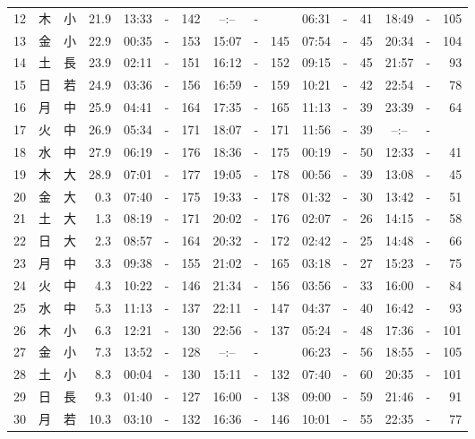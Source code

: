 \documentclass[12pt.a4j]{jsarticle}
\begin{document}
\begin{center}
\begin{table}[ht]
\begin{tabular}{|rc|cr|ccrccr|ccrccr|}
12 & 木 & 小 & 21.9 &  13:33 &-& 142  &  --:-- &-&     &   06:31 &-&  41  &   18:49 &-& 105  \\
13 & 金 & 小 & 22.9 &  00:35 &-& 153  &  15:07 &-& 145  &   07:54 &-&  45  &   20:34 &-& 104  \\
14 & 土 & 長 & 23.9 &  02:11 &-& 151  &  16:12 &-& 152  &   09:15 &-&  45  &   21:57 &-&  93  \\
15 & 日 & 若 & 24.9 &  03:36 &-& 156  &  16:59 &-& 159  &   10:21 &-&  42  &   22:54 &-&  78  \\
16 & 月 & 中 & 25.9 &  04:41 &-& 164  &  17:35 &-& 165  &   11:13 &-&  39  &   23:39 &-&  64  \\
17 & 火 & 中 & 26.9 &  05:34 &-& 171  &  18:07 &-& 171  &   11:56 &-&  39  &   --:-- &-&     \\
18 & 水 & 中 & 27.9 &  06:19 &-& 176  &  18:36 &-& 175  &   00:19 &-&  50  &   12:33 &-&  41  \\
19 & 木 & 大 & 28.9 &  07:01 &-& 177  &  19:05 &-& 178  &   00:56 &-&  39  &   13:08 &-&  45  \\
20 & 金 & 大 &  0.3 &  07:40 &-& 175  &  19:33 &-& 178  &   01:32 &-&  30  &   13:42 &-&  51  \\
21 & 土 & 大 &  1.3 &  08:19 &-& 171  &  20:02 &-& 176  &   02:07 &-&  26  &   14:15 &-&  58  \\
22 & 日 & 大 &  2.3 &  08:57 &-& 164  &  20:32 &-& 172  &   02:42 &-&  25  &   14:48 &-&  66  \\
23 & 月 & 中 &  3.3 &  09:38 &-& 155  &  21:02 &-& 165  &   03:18 &-&  27  &   15:23 &-&  75  \\
24 & 火 & 中 &  4.3 &  10:22 &-& 146  &  21:34 &-& 156  &   03:56 &-&  33  &   16:00 &-&  84  \\
25 & 水 & 中 &  5.3 &  11:13 &-& 137  &  22:11 &-& 147  &   04:37 &-&  40  &   16:42 &-&  93  \\
26 & 木 & 小 &  6.3 &  12:21 &-& 130  &  22:56 &-& 137  &   05:24 &-&  48  &   17:36 &-& 101  \\
27 & 金 & 小 &  7.3 &  13:52 &-& 128  &  --:-- &-&     &   06:23 &-&  56  &   18:55 &-& 105  \\
28 & 土 & 小 &  8.3 &  00:04 &-& 130  &  15:11 &-& 132  &   07:40 &-&  60  &   20:35 &-& 101  \\
29 & 日 & 長 &  9.3 &  01:40 &-& 127  &  16:00 &-& 138  &   09:00 &-&  59  &   21:46 &-&  91  \\
30 & 月 & 若 & 10.3 &  03:10 &-& 132  &  16:36 &-& 146  &   10:01 &-&  55  &   22:35 &-&  77  \\

\end{tabular}
\end{table}
\end{center}
\end{document}
